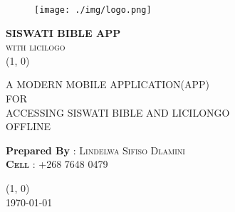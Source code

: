 \documentclass[11pt]{report}
\begin{document}
    \begin{titlepage}
        \vfill
        \thispagestyle{empty}
        \setcounter{page}{1}

        \begin{figure}[t]
            \centering
            \texttt{[image: ./img/logo.png]}
        \end{figure}

        \begin{center}
            \Large{\bfseries\scshape{SISWATI BIBLE APP}} \\
            \scshape{\small{with licilogo}} \\
            \line(1, 0){\textwidth} \\
            \vspace{3.75cm}

            \scshape{\Large{{{A MODERN MOBILE APPLICATION(APP) \\[0.5cm]FOR
            \\[0.5cm]ACCESSING SISWATI BIBLE AND LICILONGO\\[0.5cm] OFFLINE}}}}  \\

            \vspace{0.7cm}

            \vfill
            \vspace{0.3cm}
            \begin{flushright}
                \normalsize{\textbf{Prepared By} }: \scshape{\normalsize{Lindelwa Sifiso Dlamini}}\\
                \normalsize{\textbf{Cell} }: \scshape{\normalsize{+268 7648 0479}}
            \end{flushright}

            \line(1, 0){\textwidth} \\
            \scshape{\normalsize{\today}}

        \end{center}

    \end{titlepage}
\end{document}
